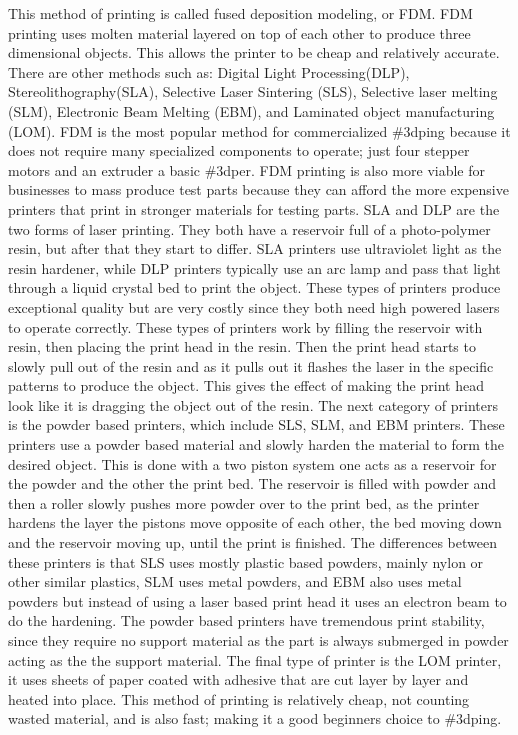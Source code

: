 \documentclass[12pt]{article}
\begin{document}
\begin{flushleft}
This method of printing is called fused deposition modeling, or FDM. FDM printing uses molten material layered on top of each other to produce three dimensional objects. This allows the printer to be cheap and relatively accurate. There are other methods such as: Digital Light Processing(DLP), Stereolithography(SLA), Selective Laser Sintering (SLS), Selective laser melting (SLM), Electronic Beam Melting (EBM), and Laminated object manufacturing (LOM). FDM is the most popular method for commercialized \#3dping because it does not require many specialized components to operate; just four stepper motors and an extruder a basic \#3dper. FDM printing is also more viable for businesses to mass produce test parts because they can afford the more expensive printers that print in stronger materials for testing parts. SLA and DLP are the two forms of laser printing. They both have a reservoir full of a photo-polymer resin, but after that they start to differ. SLA printers use ultraviolet light as the resin hardener, while DLP printers typically use an arc lamp and pass that light through a liquid crystal bed to print the object. These types of printers produce exceptional quality but are very costly since they both need high powered lasers to operate correctly. These types of printers work by filling the reservoir with resin, then placing the print head in the resin. Then the print head starts to slowly pull out of the resin and as it pulls out it flashes the laser in the specific patterns to produce the object. This gives the effect of making the print head look like it is dragging the object out of the resin. The next category of printers is the powder based printers, which include SLS, SLM, and EBM printers. These printers use a powder based material and slowly harden the material to form the desired object. This is done with a two piston system one acts as a reservoir for the powder and the other the print bed. The reservoir is filled with powder and then a roller slowly pushes more powder over to the print bed, as the printer hardens the layer the pistons move opposite of each other, the bed moving down and the reservoir moving up, until the print is finished. The differences between these printers is that SLS uses mostly plastic based powders, mainly nylon or other similar plastics, SLM uses metal powders, and EBM also uses metal powders but instead of using a laser based print head it uses an electron beam to do the hardening. The powder based printers have tremendous print stability, since they require no support material as the part is always submerged in powder acting as the the support material. The final type of printer is the LOM printer, it uses sheets of paper coated with adhesive that are cut layer by layer and heated into place. This method of printing is relatively cheap, not counting wasted material, and is also fast; making it a good beginners choice to \#3dping.


\end{flushleft}
\end{document}
